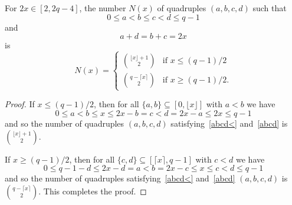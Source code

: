 \documentclass[10pt,a4paper]{amsart}
\newcommand{\beq}{\begin{equation}}
\newcommand{\eeq}{\end{equation}}
\begin{document}
\begin{lemma}
For $2x \in [2,2q-4]$,   
the number $N(x)$ of quadruples $(a,b,c,d)$  such that  
\beq              \label{abcd<}
0 \leq a < b \leq c < d \leq q-1
\eeq
and
\beq              \label{abcd}
a+d = b+c = 2x
\eeq 
is 
\[
N(x) = \begin{cases}
\binom{\lfloor x \rfloor+ 1}{2} & \text{if $x \leq (q-1)/2$}\\
\binom{q-\lceil x \rceil}{2} & \text{if $x \geq (q-1)/2$.}
\end{cases}
\] 
\end{lemma}

\begin{proof} 
If $x \leq (q-1)/2$, then for all $\{a,b\} \subseteq [0,\lfloor x \rfloor]$ 
with $a < b$ we have 
\[
0 \leq a < b \leq x \leq  2x-b = c < d = 2x-a \leq 2x \leq q-1
\]
and so the number of quadruples $(a,b,c,d)$  satisfying~\eqref{abcd<} 
and~\eqref{abcd} is $\binom{\lfloor x \rfloor + 1}{2}$.

If $x \geq (q-1)/2$, then  for all $\{c,d\} \subseteq [\lceil x \rceil, q-1]$ 
with $c < d$ we have 
\[
0 \leq q-1-d \leq 2x-d = a < b = 2x-c  \leq x \leq c < d  \leq q-1
\]
and so the number of quadruples satisfying~\eqref{abcd<} 
and~\eqref{abcd} $(a,b,c,d)$  is $\binom{q-\lceil x \rceil}{2}$.
This completes the proof. 
\end{proof}
\end{document}

